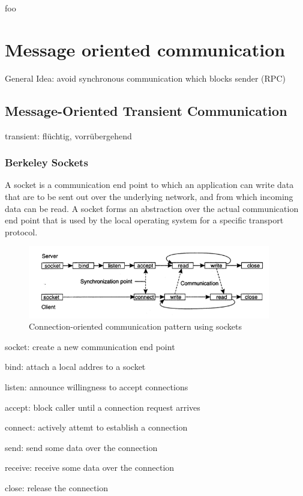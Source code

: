 \documentclass[ngerman,a4paper]{report}
\begin{document}
\begin{compactitem}
	\item foo
\end{compactitem}

\section{Message oriented communication}

General Idea: avoid synchronous communication which blocks sender (RPC)

\subsection{Message-Oriented Transient Communication}

transient: flüchtig, vorrübergehend

\subsubsection{Berkeley Sockets}

A socket is a communication end point to which an application can write data that are to be sent out over the underlying network, and from which incoming data can be read. A socket forms an abstraction over the actual communication end point that is used by the local operating system for a specific transport protocol.

\begin{figure}[h]
	\centering
	\includegraphics[width=400px]{gfx/sockets.png}
	\caption{Connection-oriented communication pattern using sockets}
	\label{img:sockets}
\end{figure}

\begin{compactitem}
	\item socket: create a new communication end point
	\item bind: attach a local addres to a socket
	\item listen: announce willingness to accept connections
	\item accept: block caller until a connection request arrives
	\item connect: actively attemt to establish a connection
	\item send: send some data over the connection
	\item receive: receive some data over the connection
	\item close: release the connection
\end{compactitem}
\end{document}
